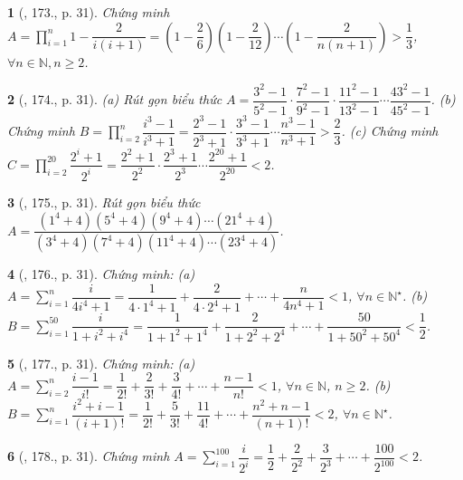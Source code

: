 \documentclass{article}
\newtheorem{baitoan}{}
\begin{document}
\begin{baitoan}[\cite{Binh_Toan_8_tap_1}, 173., p. 31]
	Chứng minh $A = \prod_{i=1}^n 1 - \dfrac{2}{i(i + 1)} = \left(1 - \dfrac{2}{6}\right)\left(1 - \dfrac{2}{12}\right)\cdots\left(1 - \dfrac{2}{n(n + 1)}\right) > \dfrac{1}{3}$, $\forall n\in\mathbb{N},n\ge2$.
\end{baitoan}

\begin{baitoan}[\cite{Binh_Toan_8_tap_1}, 174., p. 31]
	(a) Rút gọn biểu thức $A = \dfrac{3^2 - 1}{5^2 - 1}\cdot\dfrac{7^2 - 1}{9^2 - 1}\cdot\dfrac{11^2 - 1}{13^2 - 1}\cdots\dfrac{43^2 - 1}{45^2 - 1}$. (b) Chứng minh $B = \prod_{i=2}^n \dfrac{i^3 - 1}{i^3 + 1} = \dfrac{2^3 - 1}{2^3 + 1}\cdot\dfrac{3^3 - 1}{3^3 + 1}\cdots\dfrac{n^3 - 1}{n^3 + 1} > \dfrac{2}{3}$. (c) Chứng minh $C = \prod_{i=2}^{20} \dfrac{2^i + 1}{2^i} = \dfrac{2^2 + 1}{2^2}\cdot\dfrac{2^3 + 1}{2^3}\cdots\dfrac{2^{20} + 1}{2^{20}} < 2$.
\end{baitoan}

\begin{baitoan}[\cite{Binh_Toan_8_tap_1}, 175., p. 31]
	Rút gọn biểu thức $A = \dfrac{(1^4 + 4)(5^4 + 4)(9^4 + 4)\cdots(21^4 + 4)}{(3^4 + 4)(7^4 + 4)(11^4 + 4)\cdots(23^4 + 4)}$.
\end{baitoan}

\begin{baitoan}[\cite{Binh_Toan_8_tap_1}, 176., p. 31]
	Chứng minh: (a) $A = \sum_{i=1}^n \dfrac{i}{4i^4 + 1} = \dfrac{1}{4\cdot1^4 + 1} + \dfrac{2}{4\cdot2^4 + 1} + \cdots + \dfrac{n}{4n^4 + 1} < 1$, $\forall n\in\mathbb{N}^\star$. (b) $B = \sum_{i=1}^{50} \dfrac{i}{1 + i^2 + i^4} = \dfrac{1}{1 + 1^2 + 1^4} + \dfrac{2}{1 + 2^2 + 2^4} + \cdots + \dfrac{50}{1 + 50^2 + 50^4} < \dfrac{1}{2}$.
\end{baitoan}

\begin{baitoan}[\cite{Binh_Toan_8_tap_1}, 177., p. 31]
	Chứng minh: (a) $A = \sum_{i=2}^n \dfrac{i - 1}{i!} = \dfrac{1}{2!} + \dfrac{2}{3!} + \dfrac{3}{4!} + \cdots + \dfrac{n - 1}{n!} < 1$, $\forall n\in\mathbb{N}$, $n\ge2$. (b) $B = \sum_{i=1}^n \dfrac{i^2 + i - 1}{(i + 1)!} = \dfrac{1}{2!} + \dfrac{5}{3!} +  \dfrac{11}{4!} + \cdots + \dfrac{n^2 + n - 1}{(n + 1)!} < 2$, $\forall n\in\mathbb{N}^\star$.
\end{baitoan}

\begin{baitoan}[\cite{Binh_Toan_8_tap_1}, 178., p. 31]
	Chứng minh $A = \sum_{i=1}^{100} \dfrac{i}{2^i} = \dfrac{1}{2} + \dfrac{2}{2^2} + \dfrac{3}{2^3} + \cdots + \dfrac{100}{2^{100}} < 2$.
\end{baitoan}
\end{document}
